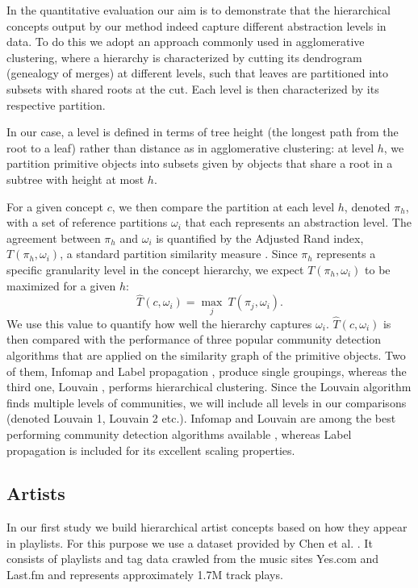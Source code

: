 \documentclass[conference]{IEEEtran}
\begin{document}
In the quantitative evaluation our aim is to demonstrate that the hierarchical concepts output by our method
indeed capture different abstraction levels in data. To do this we adopt an approach commonly used 
in agglomerative clustering, where a hierarchy is characterized by cutting its dendrogram (genealogy of merges)
at different levels, such that leaves are partitioned into subsets with shared roots at the cut. Each level is then
characterized by its respective partition. 

In our case, a level is defined in terms of tree height (the longest path from the root to a leaf) rather than
distance as in agglomerative clustering: at level $h$, we partition primitive objects into subsets given by
objects that share a root in a subtree with height at most $h$. 

For a given concept $c$, we then compare the partition at each level $h$, denoted $\pi_h$, with a set of reference partitions 
$\omega_i$ that each represents an abstraction level. The agreement between $\pi_h$  and $\omega_i$ is quantified by the 
 Adjusted Rand index, $T(\pi_h, \omega_i)$, a standard partition similarity measure \cite{Hubert1985}. 
 Since $\pi_h$ represents a specific granularity level in the concept hierarchy, 
 we expect $T(\pi_h, \omega_i)$ to be maximized for a given $h$:
\begin{equation}\label{eq:maxrand}
\hat{T}(c, \omega_i) =  \max_j \ T(\pi_j, \omega_i).
\end{equation}
We use this value to quantify how well the hierarchy captures $\omega_i$. $\hat{T}(c, \omega_i)$ is then 
compared with the performance of three popular community detection algorithms that are applied on the similarity graph of the
primitive objects. Two of them, Infomap \cite{Rosvall2008} and Label propagation \cite{Raghavan2007}, 
produce single groupings, whereas the third one, Louvain \cite{Blondel2008}, performs hierarchical clustering.
Since the Louvain algorithm finds multiple levels of communities, we will include all levels in our comparisons (denoted 
Louvain 1, Louvain 2 etc.). Infomap and Louvain are among the best performing community detection algorithms 
available \cite{Lancichinetti09}, whereas Label propagation is included for its excellent scaling properties.

\subsection{Artists}

In our first study we build hierarchical artist concepts based on how they appear in playlists. For this purpose we use 
a dataset provided by Chen et al. \cite{Chen2012}. It consists of playlists and tag data crawled from the music 
sites Yes.com and Last.fm and represents approximately 1.7M track plays. 
\end{document}
